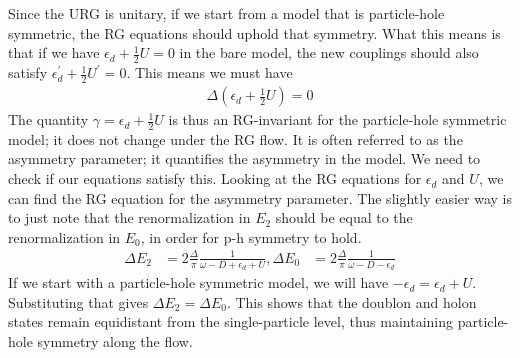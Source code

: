 \documentclass[twoside]{report}
\numberwithin{equation}{section}
\begin{document}
\\\\Since the URG is unitary, if we start from a model that is particle-hole symmetric, the RG equations should uphold that symmetry. What this means is that if we have \(\epsilon_d + \frac{1}{2} U = 0\) in the bare model, the new couplings should also satisfy \(\epsilon_d^\prime + \frac{1}{2} U^\prime = 0\). This means we must have 
\begin{equation}\begin{aligned}
	\Delta\left(\epsilon_d + \frac{1}{2} U\right) = 0
\end{aligned}\end{equation}
The quantity \(\gamma = \epsilon_d + \frac{1}{2} U\) is thus an RG-invariant for the particle-hole symmetric model; it does not change under the RG flow. It is often referred to as the asymmetry parameter; it quantifies the asymmetry in the model. We need to check if our equations satisfy this. Looking at the RG equations for \(\epsilon_d\) and \(U\), we can find the RG equation for the asymmetry parameter. The slightly easier way is to just note that the renormalization in \(E_2\) should be equal to the renormalization in \(E_0\), in order for p-h symmetry to hold.
\begin{equation}\begin{aligned}
\Delta E_2 &= 2 \frac{\Delta}{\pi}\frac{1}{\omega - D + \epsilon_d + U}, \Delta E_0 &= 2 \frac{\Delta}{\pi}\frac{1}{\omega - D - \epsilon_d}
\end{aligned}\end{equation}
If we start with a particle-hole symmetric model, we will have \(-\epsilon_d = \epsilon_d + U\). Substituting that gives \(\Delta E_2= \Delta E_0\). This shows that the doublon and holon states remain equidistant from the single-particle level, thus maintaining particle-hole symmetry along the flow.
\end{document}
